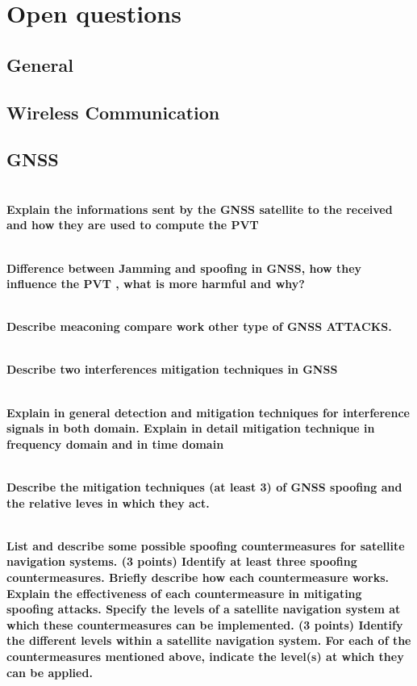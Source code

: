 \section{Open questions}


\subsection{General}

\subsection{Wireless Communication}

\subsection{GNSS}

\textbf{\\Explain the informations sent by the GNSS satellite to the received and how they are used to compute the PVT}

\textbf{\\Difference between Jamming and spoofing in GNSS, how they influence the PVT , what is more harmful and why?}

\textbf{\\Describe meaconing compare work other type of GNSS ATTACKS.}

\textbf{\\Describe two interferences mitigation techniques in GNSS}

\textbf{\\Explain in general detection and mitigation techniques for interference signals in both domain. Explain in detail mitigation technique in frequency domain and in time domain}

\textbf{\\Describe the mitigation techniques (at least 3) of GNSS spoofing and the relative leves in which they act.}

\textbf{\\
List and describe some possible spoofing countermeasures for satellite navigation systems. (3 points)
Identify at least three spoofing countermeasures.
Briefly describe how each countermeasure works.
Explain the effectiveness of each countermeasure in mitigating spoofing attacks.
Specify the levels of a satellite navigation system at which these countermeasures can be implemented. (3 points)
Identify the different levels within a satellite navigation system.
For each of the countermeasures mentioned above, indicate the level(s) at which they can be applied.
}

